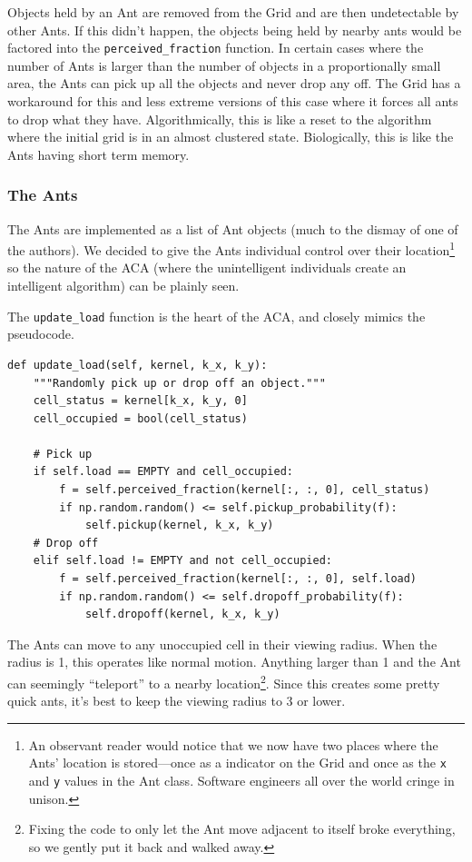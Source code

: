 \documentclass[12pt]{article}
\begin{document}
Objects held by an Ant are removed from the Grid and are then undetectable by other Ants.
If this didn't happen, the objects being held by nearby ants would be factored into the \texttt{perceived_fraction} function.
In certain cases where the number of Ants is larger than the number of objects in a proportionally small area, the Ants can pick up all the objects and never drop any off.
The Grid has a workaround for this and less extreme versions of this case where it forces all ants to drop what they have.
Algorithmically, this is like a reset to the algorithm where the initial grid is in an almost clustered state.
Biologically, this is like the Ants having short term memory.


\subsubsection{The Ants}
The Ants are implemented as a list of Ant objects (much to the dismay of one of the authors).
We decided to give the Ants individual control over their location\footnote{An observant reader would notice that we now have two places where the Ants' location is stored---once as a indicator on the Grid and once as the \texttt{x} and \texttt{y} values in the Ant class. Software engineers all over the world cringe in unison.} so the nature of the ACA (where the unintelligent individuals create an intelligent algorithm) can be plainly seen.

The \texttt{update_load} function is the heart of the ACA, and closely mimics the pseudocode.

\begin{verbatim}
def update_load(self, kernel, k_x, k_y):
    """Randomly pick up or drop off an object."""
    cell_status = kernel[k_x, k_y, 0]
    cell_occupied = bool(cell_status)

    # Pick up
    if self.load == EMPTY and cell_occupied:
        f = self.perceived_fraction(kernel[:, :, 0], cell_status)
        if np.random.random() <= self.pickup_probability(f):
            self.pickup(kernel, k_x, k_y)
    # Drop off
    elif self.load != EMPTY and not cell_occupied:
        f = self.perceived_fraction(kernel[:, :, 0], self.load)
        if np.random.random() <= self.dropoff_probability(f):
            self.dropoff(kernel, k_x, k_y)

\end{verbatim}

The Ants can move to any unoccupied cell in their viewing radius.
When the radius is 1, this operates like normal motion.
Anything larger than 1 and the Ant can seemingly ``teleport'' to a nearby location\footnote{Fixing the code to only let the Ant move adjacent to itself broke everything, so we gently put it back and walked away.}.
Since this creates some pretty quick ants, it's best to keep the viewing radius to 3 or lower.
\end{document}
